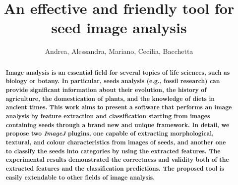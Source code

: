 \documentclass[a4paper,12pt]{article}
\title{An effective and friendly tool for seed image analysis}
\author{Andrea, Alessandra, Mariano, Cecilia, Bacchetta}
\begin{document}
\maketitle
\begin{abstract}
\textbf{Image analysis is an essential field for several topics of life sciences, such as biology or botany. In particular, seeds analysis (e.g., fossil research) can provide significant information about their evolution, the history of agriculture, the domestication of plants, and the knowledge of diets in ancient times. This work aims to present a software that performs an image analysis by feature extraction and classification starting from images containing seeds through a brand new and unique framework. In detail, we propose two \emph{ImageJ} plugins, one capable of extracting morphological, textural, and colour characteristics from images of seeds, and another one to classify the seeds into categories by using the extracted features. The experimental results demonstrated the correctness and validity both of the extracted features and the classification predictions. The proposed tool is easily extendable to other fields of image analysis.} 

\end{abstract}

\end{document}

